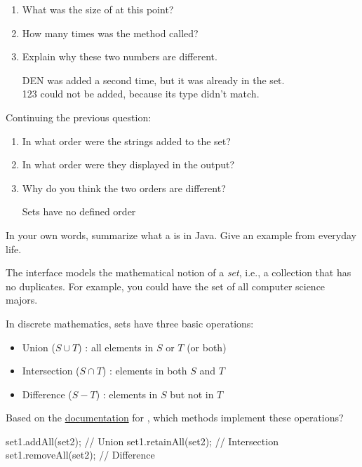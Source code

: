 \begin{enumerate}
\item What was the size of  at this point? 
\item How many times was the  method called? 
\item Explain why these two numbers are different.
\begin{answer}[2em]
DEN was added a second time, but it was already in the set. \\
123 could not be added, because its type didn't match.
\end{answer}
\vspace{-1ex}
\end{enumerate}


\Q Continuing the previous question:

\setlength{\defaultwidth}{15em}

\begin{enumerate}
\item In what order were the strings added to the set? 
\item In what order were they displayed in the output? 
\item Why do you think the two orders are different?
\begin{answer}[2em]
Sets have no defined order
\end{answer}
\vspace{-1ex}
\end{enumerate}


\Q \label{key1}
In your own words, summarize what a  is in Java.
Give an example from everyday life.

\begin{answer}
The  interface models the mathematical notion of a \emph{set}, i.e., a collection that has no duplicates.
For example, you could have the set of all computer science majors.
\end{answer}


\Q In discrete mathematics, sets have three basic operations:

\begin{itemize}[itemsep=2pt]
\item Union ($S \cup T$) : all elements in $S$ or $T$ (or both)
\item Intersection ($S \cap T$) : elements in both $S$ and $T$
\item Difference ($S - T$) : elements in $S$ but not in $T$
\end{itemize}

Based on the \href{https://docs.oracle.com/en/java/javase/11/docs/api/java.base/java/util/Set.html}{documentation} for , which methods implement these operations?

\begin{answer}
\begin{javaans}
set1.addAll(set2);    // Union
set1.retainAll(set2); // Intersection
set1.removeAll(set2); // Difference
\end{javaans}
\end{answer}
